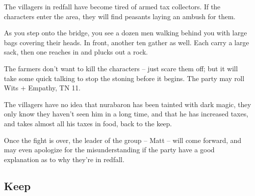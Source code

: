 \begin{multicols}{2}

The villagers in \gls{redfall} have become tired of armed tax collectors.  If the characters enter the area, they will find peasants laying an ambush for them.

\begin{boxtext}

	As you step onto the bridge, you see a dozen men walking behind you with large bags covering their heads.  In front, another ten gather as well.  Each carry a large sack, then one reaches in and plucks out a rock.

\end{boxtext}

The farmers don't want to kill the characters -- just scare them off; but it will take some quick talking to stop the stoning before it begins.  The party may roll Wits + Empathy, TN 11.

The villagers have no idea that \gls{nurabaron} has been tainted with dark magic, they only know they haven't seen him in a long time, and that he has increased taxes, and takes almost all his taxes in food, back to the keep.


\humanfarmer

Once the fight is over, the leader of the group -- Matt -- will come forward, and may even apologize for the misunderstanding if the party have a good explanation as to why they're in \gls{redfall}.

\end{multicols}

\subsection*{ Keep}

\label{redfall_keep_map}

